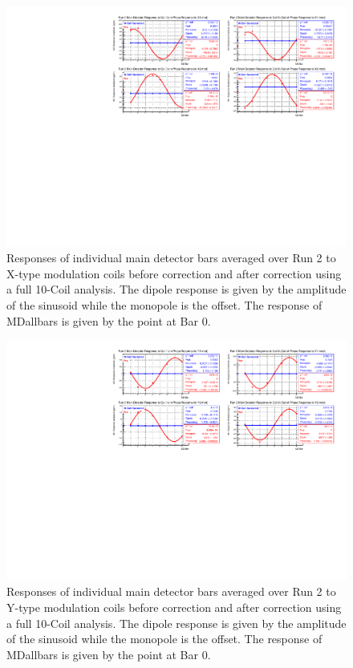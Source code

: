 \begin{figure}[!ht]
\begin{center}
\includegraphics[width=5.9in]{./Pictures/Run2_X_dipole10-Coil.pdf}
\caption{\label{fig:Run2_10coil_Xdipoles}Responses of individual main detector bars averaged over Run 2 to X-type modulation coils before correction and after correction using a full 10-Coil analysis. The dipole response is given by the amplitude of the sinusoid while the monopole is the offset. The response of MDallbars is given by the point at Bar 0.}
\end{center}
\end{figure}
\begin{figure}[!ht]
\begin{center}
\includegraphics[width=5.9in]{./Pictures/Run2_Y_dipole10-Coil.pdf}
\caption{\label{fig:Run2_10coil_Ydipoles}Responses of individual main detector bars averaged over Run 2 to Y-type modulation coils before correction and after correction using a full 10-Coil analysis. The dipole response is given by the amplitude of the sinusoid while the monopole is the offset. The response of MDallbars is given by the point at Bar 0.}
\end{center}
\end{figure}

